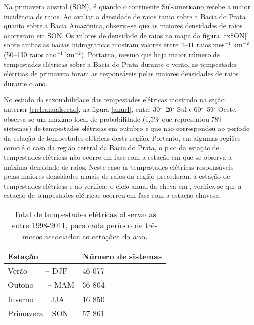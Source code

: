 Na primavera austral (SON), é quando o continente Sul-americano recebe a maior incidência de raios. Ao avaliar a densidade de raios tanto sobre a Bacia do Prata quanto sobre a Bacia Amazônica, observa-se que as maiores densidades de raios ocorreram em SON. Os valores de densidade de raios no mapa da figura \ref{txSON} sobre ambas as bacias hidrográficas  mostram valores entre 4--11 raios mes$^{-1}$ km$^{-2}$ (50--130 raios ano$^{-1}$ km$^{-2}$). Portanto, mesmo que haja maior número de tempestades elétricas sobre a Bacia do Prata durante o verão, as tempestades elétricas de primavera foram as responsáveis pelas maiores densidades de raios durante o ano.

No estudo da sazonabilidade das tempestades elétricas mostrado na seção anterior \ref{cicloanualsecao}, na figura \ref{anual}, entre 30$^{\circ}$--20$^{\circ}$ Sul e 60$^{\circ}$--50$^{\circ}$ Oeste, observa-se um máximo local de probabilidade (0,5\% que representou 789 sistemas) de tempestades elétricas em outubro e que não correspondeu ao período da estação de tempestades elétricas desta região. Portanto, em algumas regiões como é o caso da região central da Bacia do Prata,  o pico da estação de tempestades elétricas não ocorre em fase com a estação em que se observa a máxima densidade de raios. Neste caso as tempestades elétricas responsáveis pelas maiores densidades anuais de raios da região precederam a estação de tempestades elétricas e  ao verificar o ciclo anual da chuva em , verifica-se que a estação de tempestades elétricas ocorreu em fase com a estação chuvosa.




\begin{table}[!h]
\caption{Total de tempestades elétricas observadas entre 1998-2011, para cada período de três meses associados as estações do ano.}
\label{EstacaoQtd}
\centering
\small
\newcommand{\grayline}{\rowcolor[gray]{.88}}
\renewcommand {\tabularxcolumn }[1]{ >{\arraybackslash }m{#1}}
\begin{tabularx}{\textwidth}{W W} %
\hline  \hline 
Estação & Número de sistemas \\[1.5pt]  
 \hline
\grayline Verão~~~~ -- DJF & 46 077 \\[1.5pt]
Outono~~~ -- MAM & 36 804\\[1.5pt]
\grayline Inverno~~ -- JJA  & 16 850\\[1.5pt] 
Primavera -- SON & 57 861\\[1.5pt]
\hline 
\end{tabularx}
\end{table}

